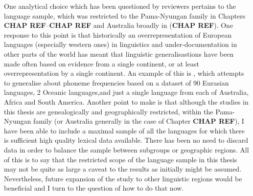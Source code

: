 One analytical choice which has been questioned by reviewers pertains to the language sample, which was restricted to the Pama-Nyungan family in Chapters \textbf{CHAP REF}--\textbf{CHAP REF} and Australia broadly in (\textbf{CHAP REF}). One response to this point is that historically an overrepresentation of European languages (especially western ones) in linguistics and under-documentation in other parts of the world has meant that linguistic generalisastions have been made often based on evidence from a single continent, or at least overrepresentation by a single continent. An example of this is \textcite{tambovtsev_phoneme_2007}, which attempts to generalise about phoneme frequencies based on a dataset of 90 Eurasian languages, 2 Oceanic languages,and just a single language from each of Australia, Africa and South America. Another point to make is that although the studies in this thesis are genealogically and geographically restricted, within the Pama-Nyungan family (or Australia generally in the case of Chapter \textbf{CHAP REF}), I have been able to include a maximal sample of all the languages for which there is sufficient high quality lexical data available. There has been no need to discard data in order to balance the sample between subgroups or geographic regions. All of this is to say that the restricted scope of the language sample in this thesis may not be quite as large a caveat to the results as initially might be assumed. Nevertheless, future expansion of the study to other linguistic regions would be beneficial and I turn to the question of how to do that now.

